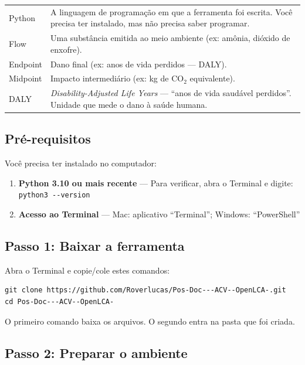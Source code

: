 \begin{longtable}{p{4cm}p{10cm}}
\addlinespace
Python & A linguagem de programa\c{c}\~ao em que a ferramenta foi escrita. Voc\^e precisa ter instalado, mas n\~ao precisa saber programar. \\
\addlinespace
Flow & Uma subst\^ancia emitida ao meio ambiente (ex: am\^onia, di\'oxido de enxofre). \\
\addlinespace
Endpoint & Dano final (ex: anos de vida perdidos --- DALY). \\
\addlinespace
Midpoint & Impacto intermedi\'ario (ex: kg de CO$_2$ equivalente). \\
\addlinespace
DALY & \textit{Disability-Adjusted Life Years} --- ``anos de vida saud\'avel perdidos''. Unidade que mede o dano \`a sa\'ude humana. \\
\bottomrule
\end{longtable}

\subsection{Pr\'e-requisitos}

Voc\^e precisa ter instalado no computador:

\begin{enumerate}
    \item \textbf{Python 3.10 ou mais recente} --- Para verificar, abra o Terminal e digite: \lstinline[style=bash]{python3 --version}
    \item \textbf{Acesso ao Terminal} --- Mac: aplicativo ``Terminal''; Windows: ``PowerShell''
\end{enumerate}

\subsection{Passo 1: Baixar a ferramenta}

Abra o Terminal e copie/cole estes comandos:

\begin{lstlisting}[style=bash]
git clone https://github.com/Roverlucas/Pos-Doc---ACV--OpenLCA-.git
cd Pos-Doc---ACV--OpenLCA-
\end{lstlisting}

O primeiro comando baixa os arquivos. O segundo entra na pasta que foi criada.

\subsection{Passo 2: Preparar o ambiente}

